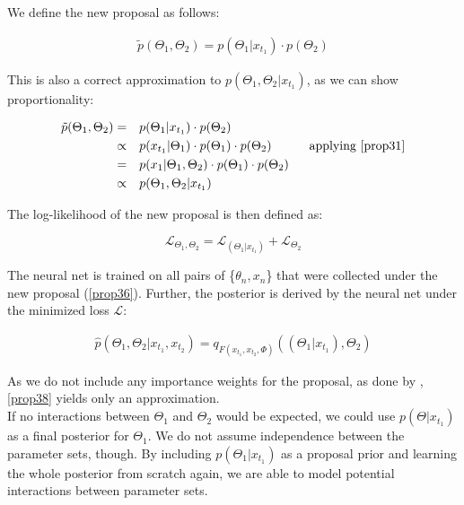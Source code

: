 \documentclass[12pt]{extreport}
\begin{document}
We define the new proposal as follows:

\begin{equation}
\label{prop36}
\begin{aligned}
    \tilde{p}(\Theta_1, \Theta_2) = p(\Theta_1|x_{t_1}) \cdot p(\Theta_2 )
\end{aligned}
\end{equation}

This is also a correct approximation to $p(\Theta_1, \Theta_2|x_{t_1})$, as we can show proportionality:

\begin{equation}
\label{prop37}
\begin{aligned}
    \tilde{p}(\Theta_1, \Theta_2) =& \quad p(\Theta_1|x_{t_1}) \cdot p(\Theta_2) \\
    \propto & \quad p(x_{t_1}|\Theta_1) \cdot p(\Theta_1) \cdot p(\Theta_2)  \quad \quad & \mbox{applying \ref{prop31}}\\
    = & \quad p(x_1|\Theta_1, \Theta_2) \cdot p(\Theta_1) \cdot p(\Theta_2)  \\
    \propto & \quad  p(\Theta_1, \Theta_2 |x_{t_1}) 
\end{aligned}
\end{equation}


The log-likelihood of the new proposal is then defined as:

$$ \mathcal{L}_{\Theta_1,\Theta_2} = \mathcal{L}_{(\Theta_1|x_{t_1})} + \mathcal{L}_{\Theta_2}$$

The neural net is trained on all pairs of \{$\theta_n, x_n$\} that were collected under the new proposal (\ref{prop36}). Further, the posterior is derived by the neural net under the minimized loss $\mathcal{L}$:

\begin{equation}
\label{prop38}
\begin{aligned}
    \hat{p}(\Theta_1, \Theta_2|x_{t_1}, x_{t_2}) = q_{F(x_{t_1}, x_{t_2},\Phi)}((\Theta_1|x_{t_1}), \Theta_2)
\end{aligned}
\end{equation}

As we do not include any importance weights for the proposal, as done by \cite{greenberg_automatic_2019}, \ref{prop38} yields only an approximation. 
\\

If no interactions between $\Theta_1$ and $\Theta_2$ would be expected, we could use $p(\Theta|x_{t_1})$ as a final posterior for $\Theta_1$. We do not assume independence between the parameter sets, though. By including $p(\Theta_1|x_{t_1})$ as a proposal prior and learning the whole posterior from scratch again, we are able to model potential interactions between parameter sets.  
\end{document}

